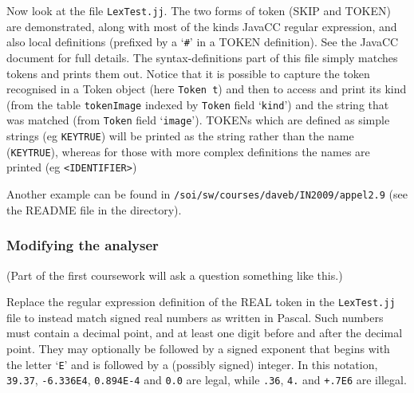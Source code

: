 \documentclass{article}
\begin{document}
Now look at the file \verb+LexTest.jj+.
The two forms of token (SKIP and TOKEN) are
demonstrated, along with most of the kinds
JavaCC regular expression, and also
local definitions (prefixed by a `\verb+#+'
in a TOKEN definition). See the JavaCC document
for full details. The syntax-definitions part 
of this file simply matches tokens and
prints them out. Notice that it is possible
to capture the token recognised in a Token object 
(here \verb+Token t+) and then to access and print
its kind (from the table \verb+tokenImage+ indexed
by \verb+Token+ field `\verb+kind+') and
the string that was matched (from \verb+Token+ field
`\verb+image+'). TOKENs which are defined as simple
strings (eg \verb+KEYTRUE+) will be printed as 
the string rather than the name (\verb+KEYTRUE+),
whereas for those with more complex definitions
the names are printed (eg  \verb+<IDENTIFIER>+)

Another example can be found in
\verb+/soi/sw/courses/daveb/IN2009/appel2.9+ (see the README file in the 
directory). 


\subsubsection*{Modifying the analyser}

(Part of the first coursework will ask a question something like this.)

Replace the regular expression
definition of the REAL token in the \verb+LexTest.jj+ file
to instead match signed real
numbers as written in Pascal.
Such numbers must contain a decimal point, and at least one
digit before and after the decimal point.
They may optionally be followed by a signed exponent
that begins with the letter `\verb"E"' and is followed
by a (possibly signed) integer.
In this notation, \verb"39.37", \verb"-6.336E4", \verb"0.894E-4" and
\verb"0.0" are legal, while \verb".36", \verb"4."
and \verb"+.7E6" are illegal.
\end{document}
